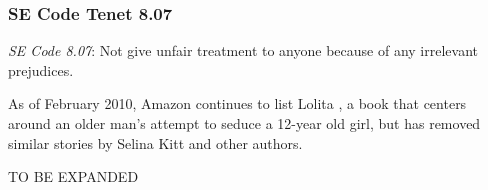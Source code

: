 \documentclass[11pt]{article}
\begin{document}
\begin{multicols}{2}
\subsubsection{SE Code Tenet 8.07}

\emph{SE Code 8.07}: Not give unfair treatment to anyone because of any irrelevant prejudices.

As of February 2010, Amazon continues to list Lolita \cite{AmazonLolitaDTPListing}, a book that centers around an older man's attempt to seduce a 12-year old girl, but has removed similar stories by Selina Kitt and other authors. \cite{KittSelfPubRevolution} 

TO BE EXPANDED










\end{multicols}
\end{document}
